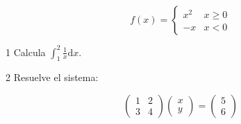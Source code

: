 \documentclass[11pt]{article}
\begin{document}
\begin{equation}
f(x) = \begin{cases}x^{2}&x \geq 0 \\ -x&x < 0\end{cases}
\end{equation}

\begin{clproblem}{1}{}
Calcula \(\int_{1}^{2} \frac{1}{x}\mathrm{d}x\).

\end{clproblem}

\begin{clproblem}{2}{}
Resuelve el sistema:

\begin{equation}
\begin{pmatrix}1 & 2 \\ 3 & 4\end{pmatrix} \begin{pmatrix}x \\ y\end{pmatrix} = \begin{pmatrix}5 \\ 6\end{pmatrix}
\end{equation}
\end{clproblem}
\end{document}
